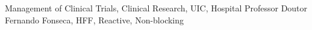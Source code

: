 

\begin{keywords}
Management of Clinical Trials, Clinical Research, UIC, Hospital Professor Doutor Fernando Fonseca, HFF, Reactive, Non-blocking
\end{keywords} 
